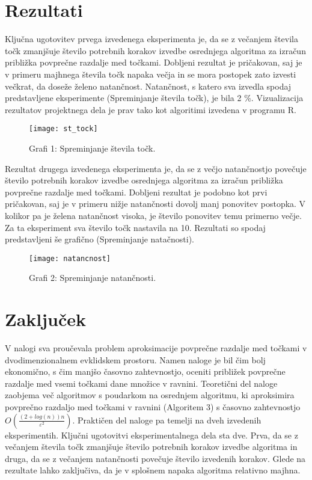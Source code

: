 \documentclass[12pt,a4paper]{amsart}
\theoremstyle{definition} %
\theoremstyle{plain} %
\begin{document}
\section{Rezultati}

Ključna ugotovitev prvega izvedenega eksperimenta je, da se z večanjem števila točk zmanjšuje število potrebnih korakov izvedbe osrednjega algoritma za izračun približka povprečne razdalje med točkami. Dobljeni rezultat je pričakovan, saj je v primeru majhnega števila točk napaka večja in se mora postopek zato izvesti večkrat, da doseže želeno natančnost. Natančnost, s katero sva izvedla spodaj predstavljene eksperimente (Spreminjanje števila točk), je bila 2 \%. Vizualizacija rezultatov projektnega dela je prav tako kot algoritimi izvedena v programu R.
\vspace{3mm}
\begin{figure}[H]
\texttt{[image: st\_tock]}
 \caption*{Grafi 1: Spreminjanje števila točk.}
\centering
\end{figure}

Rezultat drugega izvedenega eksperimenta je, da se z večjo natančnostjo povečuje število potrebnih korakov izvedbe osrednjega algoritma za izračun približka povprečne razdalje med točkami. Dobljeni rezultat je podobno kot prvi pričakovan, saj je v primeru nižje natančnosti dovolj manj ponovitev postopka. V kolikor pa je želena natančnost visoka, je število ponovitev temu primerno večje. Za ta eksperiment sva število točk nastavila na 10. Rezultati so spodaj predstavljeni še grafično  (Spreminjanje natačnosti).

\vspace{3mm}
\begin{figure}[H]
\texttt{[image: natancnost]}
 \caption*{Grafi 2: Spreminjanje natančnosti.}
\centering
\end{figure}

\section{Zaključek}

V nalogi sva proučevala problem aproksimacije povprečne razdalje med točkami v dvodimenzionalnem evklidskem prostoru. Namen naloge je bil čim bolj ekonomično, s čim manjšo časovno zahtevnostjo, oceniti približek povprečne razdalje med vsemi točkami dane množice v ravnini. Teoretični del naloge zaobjema več algoritmov s poudarkom na osrednjem algoritmu, ki aproksimira povprečno razdaljo med točkami v ravnini (Algoritem 3) s časovno zahtevnostjo $O(\frac{(2+log(n))n}{\varepsilon^2})$. Praktičen del naloge pa temelji na dveh izvedenih eksperimentih. Ključni ugotovitvi eksperimentalnega dela sta dve. Prva, da se z večanjem števila točk zmanjšuje število potrebnih korakov izvedbe algoritma in druga, da se z večanjem natančnosti povečuje število izvedenih korakov. Glede na rezultate lahko zaključiva, da je v splošnem napaka algoritma relativno majhna. 
\end{document}
